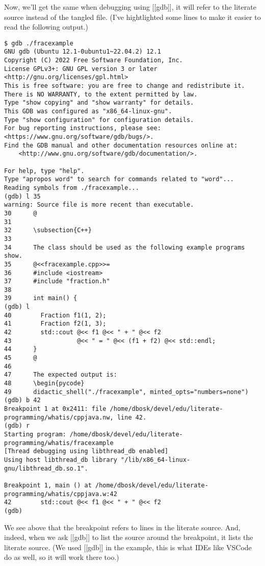 Now, we'll get the same when debugging using [[gdb]], it will refer to the 
literate source instead of the tangled file.
(I've hightlighted some lines to make it easier to read the following output.)
\begin{verbatim}
$ gdb ./fracexample
GNU gdb (Ubuntu 12.1-0ubuntu1~22.04.2) 12.1
Copyright (C) 2022 Free Software Foundation, Inc.
License GPLv3+: GNU GPL version 3 or later <http://gnu.org/licenses/gpl.html>
This is free software: you are free to change and redistribute it.
There is NO WARRANTY, to the extent permitted by law.
Type "show copying" and "show warranty" for details.
This GDB was configured as "x86_64-linux-gnu".
Type "show configuration" for configuration details.
For bug reporting instructions, please see:
<https://www.gnu.org/software/gdb/bugs/>.
Find the GDB manual and other documentation resources online at:
    <http://www.gnu.org/software/gdb/documentation/>.

For help, type "help".
Type "apropos word" to search for commands related to "word"...
Reading symbols from ./fracexample...
(gdb) l 35
warning: Source file is more recent than executable.
30      @
31
32      \subsection{C++}
33
34      The class should be used as the following example programs show.
35      @<<fracexample.cpp>>=
36      #include <iostream>
37      #include "fraction.h"
38
39      int main() {
(gdb) l
40        Fraction f1(1, 2);
41        Fraction f2(1, 3);
42        std::cout @<< f1 @<< " + " @<< f2
43                  @<< " = " @<< (f1 + f2) @<< std::endl;
44      }
45      @
46
47      The expected output is:
48      \begin{pycode}
49      didactic_shell("./fracexample", minted_opts="numbers=none")
(gdb) b 42
Breakpoint 1 at 0x2411: file /home/dbosk/devel/edu/literate-programming/whatis/cppjava.nw, line 42.
(gdb) r
Starting program: /home/dbosk/devel/edu/literate-programming/whatis/fracexample 
[Thread debugging using libthread_db enabled]
Using host libthread_db library "/lib/x86_64-linux-gnu/libthread_db.so.1".

Breakpoint 1, main () at /home/dbosk/devel/edu/literate-programming/whatis/cppjava.w:42
42        std::cout @<< f1 @<< " + " @<< f2
(gdb) 
\end{verbatim}
We see above that the breakpoint refers to lines in the literate source.
And, indeed, when we ask [[gdb]] to list the source around the breakpoint, it 
lists the literate source.
(We used [[gdb]] in the example, this is what IDEs like VSCode do as well, so 
it will work there too.)

